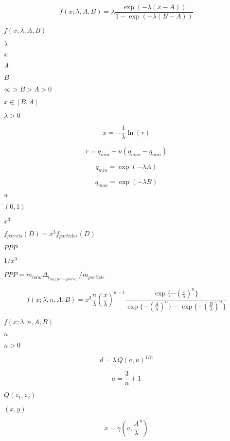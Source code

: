 \documentclass{article}
\begin{document}
\[
    f(x; \lambda, A, B) =
        \lambda \frac{\exp(-\lambda (x - A))}{1 - \exp(-\lambda(B-A))}
\]
\pagebreak

$        f(x; \lambda, A, B) $
\pagebreak

$        \lambda   $
\pagebreak

$        x         $
\pagebreak

$        A         $
\pagebreak

$        B         $
\pagebreak

$ \infty > B > A > 0 $
\pagebreak

$ x \in [B,A] $
\pagebreak

$ \lambda > 0 $
\pagebreak

\[
        x = - \frac{1}{\lambda} \ln (r)
    \]
\pagebreak

\[
        r = q_{min} + u (q_{max} - q_{min})
    \]
\pagebreak

\[
        q_{min} = \exp(-\lambda A)
    \]
\pagebreak

\[
        q_{max} = \exp(-\lambda B)
    \]
\pagebreak

$ u $
\pagebreak

$ (0, 1) $
\pagebreak

$x^3$
\pagebreak

$ f_{parcels}(D) = x^3 f_{particles}(D) $
\pagebreak

$ PPP $
\pagebreak

$ 1/x^3 $
\pagebreak

$ PPP = \dot{m}_{total}
\Delta_{t_{inj(per-parcel)}} / {m}_{particle}  $
\pagebreak

\[
    f(x; \lambda, n, A, B) =
            x^3
            \frac{n}{\lambda}
            \left( \frac{x}{\lambda} \right)^{n-1}
            \frac{
                \exp\{ -(\frac{x}{\lambda})^n \}
            }
            {
                \exp\{ -(\frac{A}{\lambda})^n \}
              - \exp\{ -(\frac{B}{\lambda})^n \}
            }
\]
\pagebreak

$        f(x; \lambda, n, A, B) $
\pagebreak

$        n         $
\pagebreak

$ n > 0 $
\pagebreak

\[
        d = \lambda \, Q(a, u)^{1/n}
    \]
\pagebreak

\[
        a = \frac{3}{n} + 1
    \]
\pagebreak

$ Q(z_1, z_2) $
\pagebreak

$ (x, y) $
\pagebreak

\[
        x = \gamma \left( a, \frac{A}{\lambda}^n \right)
    \]
\pagebreak
\end{document}
